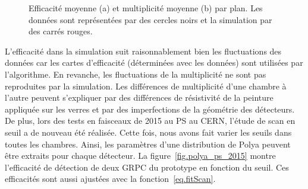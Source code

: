 \begin{figure}[!ht]
  \caption{Efficacité moyenne (a) et multiplicité moyenne (b) par plan. Les données sont représentées par des cercles noirs et la simulation par des carrés rouges.\label{fig.eff_mul_layer}}
\end{figure}
L'efficacité dans la simulation suit raisonnablement bien les fluctuations des données car les cartes d'efficacité (déterminées avec les données) sont utilisées par l'algorithme. En revanche, les fluctuations de la multiplicité ne sont pas reproduites par la simulation. Les différences de multiplicité d'une chambre à l'autre peuvent s'expliquer par des différences de résistivité de la peinture appliquée sur les verres et par des imperfections de la géométrie des détecteurs. De plus, lors des tests en faisceaux de 2015 au PS au CERN, l'étude de scan en seuil a de nouveau été réalisée. Cette fois, nous avons fait varier les seuils dans toutes les chambres. Ainsi, les paramètres d'une distribution de Polya peuvent être extraits pour chaque détecteur. La figure~\ref{fig.polya_ps_2015} montre l'efficacité de détection de deux GRPC du prototype en fonction du seuil. Ces efficacités sont aussi ajustées avec la fonction~\ref{eq.fitScan}.
